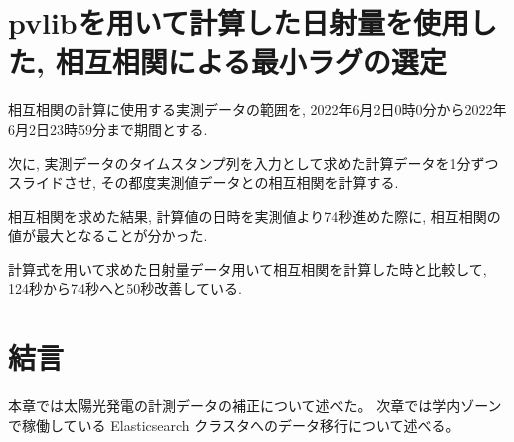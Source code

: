 \section{pvlibを用いて計算した日射量を使用した, 相互相関による最小ラグの選定}
相互相関の計算に使用する実測データの範囲を, 2022年6月2日0時0分から2022年6月2日23時59分まで期間とする.

次に, 実測データのタイムスタンプ列を入力として求めた計算データを1分ずつスライドさせ, その都度実測値データとの相互相関を計算する.

相互相関を求めた結果, 計算値の日時を実測値より74秒進めた際に, 相互相関の値が最大となることが分かった.

計算式を用いて求めた日射量データ用いて相互相関を計算した時と比較して, 124秒から74秒へと50秒改善している.

\section{結言}
本章では太陽光発電の計測データの補正について述べた。
次章では学内ゾーンで稼働している Elasticsearch クラスタへのデータ移行について述べる。